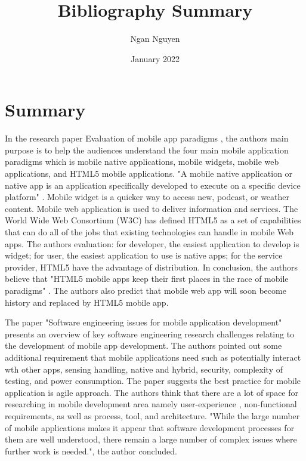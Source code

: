 \documentclass{article}
\title{Bibliography Summary}
\author{Ngan Nguyen}
\date{January 2022}
\begin{document}
\maketitle

\section*{Summary}
In the research paper Evaluation of mobile app paradigms \cite{10.1145/2428955.2428968}, the authors main purpose is to help the audiences understand the four main mobile application paradigms which is mobile native applications, mobile widgets, mobile web applications, and HTML5 mobile applications. "A mobile native application or native app is an application
specifically developed to execute on a specific device platform" \cite{10.1145/2428955.2428968}. Mobile widget is a quicker way to access new, podcast, or weather content. Mobile web application is used to deliver information and services. The World Wide Web Consortium (W3C) has defined HTML5 as a set of capabilities that can do all of the jobs that existing technologies can handle in mobile Web apps. The authors evaluation: for developer, the easiest application to develop is widget; for user, the easiest application to use is native apps; for the service provider, HTML5 have the advantage of distribution. In conclusion, the authors believe that "HTML5 mobile apps keep their first places in the race of mobile paradigms" \cite{10.1145/2428955.2428968}. The authors also predict that mobile web app will soon become history and replaced by HTML5 mobile app. 

\medskip

The paper "Software engineering issues for mobile application development" \cite{10.1145/1882362.1882443} presents an overview of key software engineering research challenges relating to the development of mobile app development. The authors pointed out some additional requirement that mobile applications need such as potentially interact wth other apps, sensing handling, native and hybrid, security, complexity of testing, and power consumption. The paper suggests the best practice for mobile application is agile approach. The authors think that there are a lot of space for researching in mobile development area namely user-experience , non-functional requirements, as well as process, tool, and architecture. "While the large number of mobile applications makes it appear
that software development processes for them are well understood, there remain a large number of complex issues where further work is needed."\cite{10.1145/1882362.1882443}, the author concluded.






\printbibliography
\end{document}
